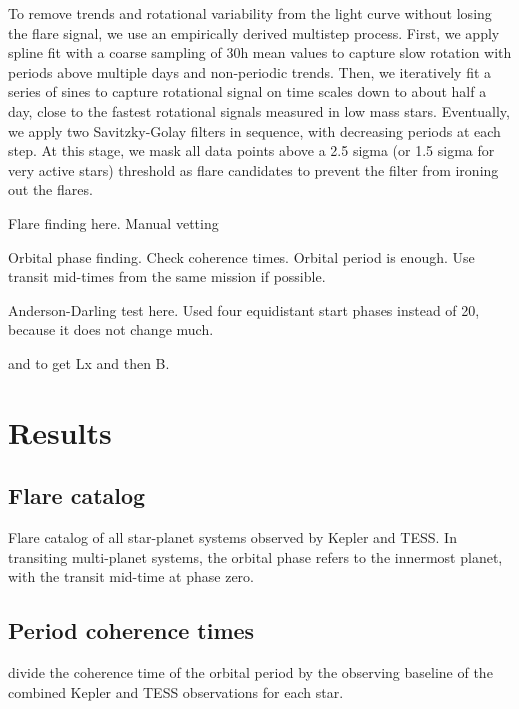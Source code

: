 \documentclass[twocolumn]{aastex631}
\begin{document}
To remove trends and rotational variability from the light curve without losing the flare signal, we use an empirically derived multistep process. First, we apply spline fit with a coarse sampling of 30h mean values to capture slow rotation with periods above multiple days and non-periodic trends. Then, we iteratively fit a series of sines to capture rotational signal on time scales down to about half a day, close to the fastest rotational signals measured in low mass stars. Eventually, we apply two Savitzky-Golay filters in sequence, with decreasing periods at each step. At this stage, we mask all data points above a 2.5 sigma (or 1.5 sigma for very active stars) threshold as flare candidates to prevent the filter from ironing out the flares.

Flare finding here. Manual vetting

Orbital phase finding. Check coherence times. Orbital period is enough.
Use transit mid-times from the same mission if possible.

Anderson-Darling test here. Used four equidistant start phases instead of 20, because it does not change much.

\cite{foster2022identifying} and \cite{reiners2022magnetism} to get Lx and then B.

\section{Results}
\label{sec:results}

\subsection{Flare catalog}

\begin{table*}
    \centering
            \caption{
            Flare catalog of all star-planet systems observed by Kepler and TESS. In transiting multi-planet systems, the orbital phase refers to the innermost planet, with the transit mid-time at phase zero. 
        }
    
        \label{fig:random_numbers}
\end{table*}

\subsection{Period coherence times}

divide the coherence time of the orbital period by the observing baseline of the combined Kepler and TESS observations for each star.
\end{document}
